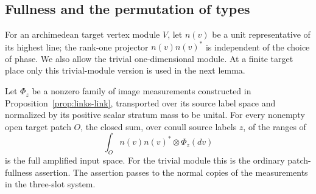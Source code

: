 \subsection{Fullness and the permutation of types}

For an archimedean target vertex module $V$, let $n(v)$ be a unit
representative of its highest line; the rank-one projector
$n(v)n(v)^*$ is independent of the choice of phase. We also allow the
trivial one-dimensional module. At a finite target place only this
trivial-module version is used in the next lemma.

\begin{lemma}
\label{lem:transfer-fullness}
Let $\Phi_z$ be a nonzero family of image measurements constructed in
Proposition~\ref{prop:links-link}, transported over its source label
space and normalized by its positive scalar stratum mass to be unital. For every
nonempty open target patch $O$, the closed sum, over conull source
labels $z$, of the ranges of
\begin{equation}
 \int_O n(v)n(v)^*\otimes\Phi_z(dv)
 \label{eq:transfer-line-effect}
\end{equation}
is the full amplified input space. For the trivial module this is the
ordinary patch-fullness assertion. The assertion passes to the normal
copies of the measurements in the three-slot system.
\end{lemma}


